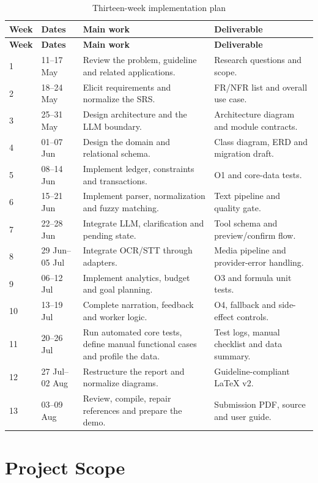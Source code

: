 \begin{longtable}{@{}C{1.2cm}L{2.7cm}L{6.2cm}L{3.8cm}@{}}
  \caption{Thirteen-week implementation plan}\label{tab:implementation-plan}\\
  \toprule
  \textbf{Week} & \textbf{Dates} & \textbf{Main work} & \textbf{Deliverable} \\
  \midrule
  \endfirsthead
  \toprule
  \textbf{Week} & \textbf{Dates} & \textbf{Main work} & \textbf{Deliverable} \\
  \midrule
   & 11--17 May & Review the problem, guideline and related applications. & Research questions and scope. \\
  2 & 18--24 May & Elicit requirements and normalize the SRS. & FR/NFR list and overall use case. \\
  3 & 25--31 May & Design architecture and the LLM boundary. & Architecture diagram and module contracts. \\
  4 & 01--07 Jun & Design the domain and relational schema. & Class diagram, ERD and migration draft. \\
  5 & 08--14 Jun & Implement ledger, constraints and transactions. & O1 and core-data tests. \\
  6 & 15--21 Jun & Implement parser, normalization and fuzzy matching. & Text pipeline and quality gate. \\
  7 & 22--28 Jun & Integrate LLM, clarification and pending state. & Tool schema and preview/confirm flow. \\
  8 & 29 Jun--05 Jul & Integrate OCR/STT through adapters. & Media pipeline and provider-error handling. \\
  9 & 06--12 Jul & Implement analytics, budget and goal planning. & O3 and formula unit tests. \\
  10 & 13--19 Jul & Complete narration, feedback and worker logic. & O4, fallback and side-effect controls. \\
  11 & 20--26 Jul & Run automated core tests, define manual functional cases and profile the data. & Test logs, manual checklist and data summary. \\
  12 & 27 Jul--02 Aug & Restructure the report and normalize diagrams. & Guideline-compliant LaTeX v2. \\
  13 & 03--09 Aug & Review, compile, repair references and prepare the demo. & Submission PDF, source and user guide. \\
  \bottomrule
\end{longtable}

\section{Project Scope}

